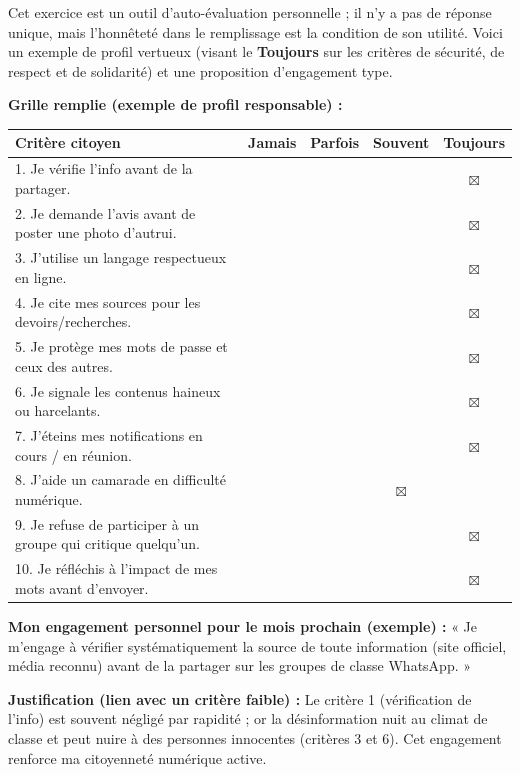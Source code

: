 \documentclass[11pt]{article}
\newcommand{\cle}[1]{{\popxbold\color{popdark}#1}}
\begin{document}
\begin{corrige}
Cet exercice est un outil d'auto-évaluation personnelle ; il n'y a pas de réponse unique, mais l'honnêteté dans le remplissage est la condition de son utilité. Voici un exemple de profil vertueux (visant le \textbf{Toujours} sur les critères de sécurité, de respect et de solidarité) et une proposition d'engagement type.

\textbf{Grille remplie (exemple de profil responsable) :}
\begin{center}
\begin{tabularx}{\linewidth}{|X|c|c|c|c|}\hline
\rowcolor{popblueL}\textbf{Critère citoyen} & \textbf{Jamais} & \textbf{Parfois} & \textbf{Souvent} & \textbf{Toujours} \\\hline
1. Je vérifie l'info avant de la partager. & & & & $\boxtimes$ \\\hline
2. Je demande l'avis avant de poster une photo d'autrui. & & & & $\boxtimes$ \\\hline
3. J'utilise un langage respectueux en ligne. & & & & $\boxtimes$ \\\hline
4. Je cite mes sources pour les devoirs/recherches. & & & & $\boxtimes$ \\\hline
5. Je protège mes mots de passe et ceux des autres. & & & & $\boxtimes$ \\\hline
6. Je signale les contenus haineux ou harcelants. & & & & $\boxtimes$ \\\hline
7. J'éteins mes notifications en cours / en réunion. & & & & $\boxtimes$ \\\hline
8. J'aide un camarade en difficulté numérique. & & & $\boxtimes$ & \\\hline
9. Je refuse de participer à un groupe qui critique quelqu'un. & & & & $\boxtimes$ \\\hline
10. Je réfléchis à l'impact de mes mots avant d'envoyer. & & & & $\boxtimes$ \\\hline
\end{tabularx}
\end{center}

\textbf{Mon engagement personnel pour le mois prochain (exemple) :} « Je m'engage à vérifier systématiquement la source de toute information (site officiel, média reconnu) avant de la partager sur les groupes de classe WhatsApp. »

\textbf{Justification (lien avec un critère faible) :} Le critère 1 (vérification de l'info) est souvent négligé par rapidité ; or la \cle{désinformation} nuit au climat de classe et peut nuire à des personnes innocentes (critères 3 et 6). Cet engagement renforce ma \cle{citoyenneté numérique} active.
\end{corrige}
\end{document}
